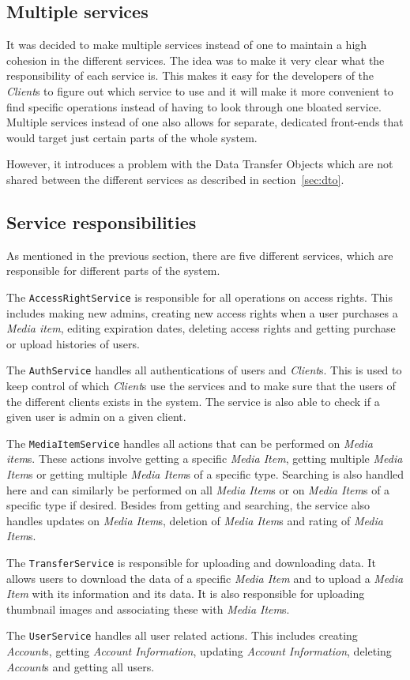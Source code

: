 \documentclass[../report.tex]{subfiles}
\begin{document}
\subsection{Multiple services}
It was decided to make multiple services instead of one to maintain a high cohesion in the different services.
The idea was to make it very clear what the responsibility of each service is. 
This makes it easy for the developers of the \textit{Client}s to figure out which service to use and it will make it more convenient to find specific operations instead of having to look through one bloated service.
Multiple services instead of one also allows for separate, dedicated front-ends that would target just certain parts of the whole system. 

However, it introduces a problem with the Data Transfer Objects which are not shared between the different services as described in section~\ref{sec:dto}.

\subsection{Service responsibilities}
As mentioned in the previous section, there are five different services, which are responsible for different parts of the system. 

The \texttt{AccessRightService} is responsible for all operations on access rights. This includes making new admins, creating new access rights when a user purchases a \textit{Media item}, editing expiration dates, deleting access rights and getting purchase or upload histories of users. 

The \texttt{AuthService} handles all authentications of users and \textit{Client}s. This is used to keep control of which \textit{Client}s use the services and to make sure that the users of the different clients exists in the system. The service is also able to check if a given user is admin on a given client.

The \texttt{MediaItemService} handles all actions that can be performed on \textit{Media item}s. These actions involve getting a specific \textit{Media Item}, getting multiple \textit{Media Item}s or getting multiple \textit{Media Item}s of a specific type. Searching is also handled here and can similarly be performed on all \textit{Media Item}s or on \textit{Media Item}s of a specific type if desired. Besides from getting and searching, the service also handles updates on \textit{Media Item}s, deletion of \textit{Media Item}s and rating of \textit{Media Item}s.

The \texttt{TransferService} is responsible for uploading and downloading data. It allows users to download the data of a specific \textit{Media Item} and to upload a \textit{Media Item} with its information and its data. It is also responsible for uploading thumbnail images and associating these with \textit{Media Item}s.

The \texttt{UserService} handles all user related actions. This includes creating \textit{Account}s, getting \textit{Account Information}, updating \textit{Account Information}, deleting \textit{Account}s and getting all users. 
\end{document}
